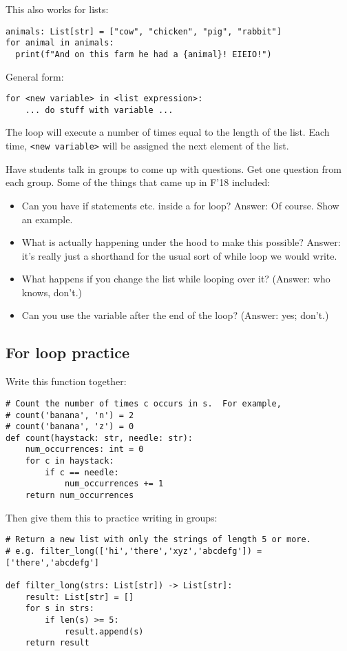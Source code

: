 \documentclass{article}
\begin{document}
This also works for lists:
\begin{verbatim}
animals: List[str] = ["cow", "chicken", "pig", "rabbit"]
for animal in animals:
  print(f"And on this farm he had a {animal}! EIEIO!")
\end{verbatim}

General form:
\begin{verbatim}
for <new variable> in <list expression>:
    ... do stuff with variable ...
\end{verbatim}

The loop will execute a number of times equal to the length of the
list.  Each time, \verb|<new variable>| will be assigned the next
element of the list.

Have students talk in groups to come up with questions.  Get one
question from each group.  Some of the things that came up in F'18
included:

\begin{itemize}
\item Can you have if statements etc. inside a for loop?  Answer: Of
  course.  Show an example.
\item What is actually happening under the hood to make this possible?
  Answer: it's really just a shorthand for the usual sort of while
  loop we would write.
\item What happens if you change the list while looping over it?
  (Answer: who knows, don't.)
\item Can you use the variable after the end of the loop? (Answer:
  yes; don't.)
\end{itemize}

\subsection*{For loop practice}

Write this function together:
\begin{verbatim}
# Count the number of times c occurs in s.  For example,
# count('banana', 'n') = 2
# count('banana', 'z') = 0
def count(haystack: str, needle: str):
    num_occurrences: int = 0
    for c in haystack:
        if c == needle:
            num_occurrences += 1
    return num_occurrences
\end{verbatim}

Then give them this to practice writing in groups:
\begin{verbatim}
# Return a new list with only the strings of length 5 or more.
# e.g. filter_long(['hi','there','xyz','abcdefg']) = ['there','abcdefg']

def filter_long(strs: List[str]) -> List[str]:
    result: List[str] = []
    for s in strs:
        if len(s) >= 5:
            result.append(s)
    return result
\end{verbatim}
\end{document}
